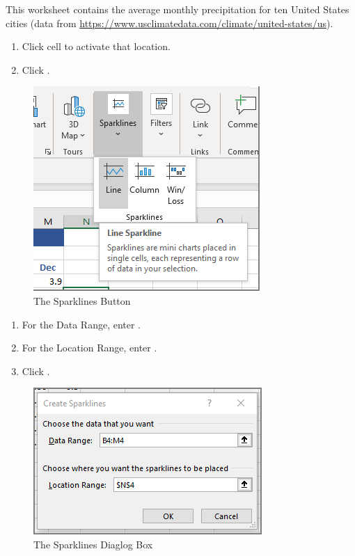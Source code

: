 This worksheet contains the average monthly precipitation for ten United States cities (data from  \url{https://www.usclimatedata.com/climate/united-states/us}).

\begin{enumerate}[resume]
	\item Click cell  to activate that location.
	\item Click .
\end{enumerate}

\begin{figure}[H]
	\centering
	\includegraphics[width=\maxwidth{.95\linewidth}]{gfx/ch08_fig01}
	\caption{The Sparklines Button}
	\label{08:fig01}
\end{figure}

\begin{enumerate}[resume]
		
	\item For the Data Range, enter .
	\item For the Location Range, enter .
	\item Click .
\end{enumerate}

\begin{figure}[H]
	\centering
	\includegraphics[width=\maxwidth{.95\linewidth}]{gfx/ch08_fig02}
	\caption{The Sparklines Diaglog Box}
	\label{08:fig02}
\end{figure}

